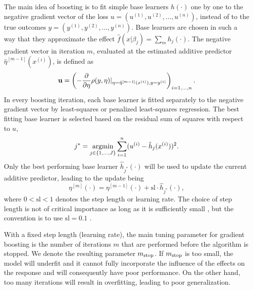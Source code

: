 The main idea of boosting is to fit simple base learners $h(\cdot)$ one by one to the negative gradient vector of the loss $u=(u^{(1)},u^{(2)},\ldots,u^{(n)})$, instead of to the true outcomes $y=(y^{(1)},y^{(2)},\ldots,y^{(n)})$. Base learners are chosen in such a way that they approximate the effect $\hat{f}(x|\beta_j)=\sum_mh_j(\cdot)$. The negative gradient vector in iteration $m$, evaluated at the estimated additive predictor $\hat{\eta}^{[m-1]}(x^{(i)})$, is defined as
\begin{equation*}
    \mathbf{u}=\left(-\frac{\partial}{\partial\eta}\rho(y,\eta)\rvert_{\eta=\hat{\eta}^{[m-1]}(x^{(i)}),y=y^{(i)}}\right)_{i=1,\ldots,n}.
\end{equation*}
In every boosting iteration, each base learner is fitted separately to the negative gradient vector by least-squares or penalized least-squares regression.
The best fitting base learner is selected based on the residual sum of squares with respect to $u$,
\begin{equation*}
    j^*=\operatorname*{argmin}_{j\in\{1,\ldots,J\}}\sum_{i=1}^{n}(u^{(i)}-\hat{h}_j(x^{(i)}))^2.
\end{equation*}
Only the best performing base learner $\hat{h}_{j^*}(\cdot)$ will be used to update the current additive predictor, leading to the update being
\begin{equation*}
    \eta^{[m]}(\cdot)=\eta^{[m-1]}(\cdot)+\text{sl}\cdot\hat{h}_{j^*}(\cdot),
\end{equation*}
where $0<\text{sl}<1$ denotes the step length or learning rate. The choice of step length is not of critical importance as long as it is sufficiently small \citep{schmid-hothorn}, but the convention is to use $\text{sl}=0.1$ \citep{mayr14a}.

With a fixed step length (learning rate), the main tuning parameter for gradient boosting is the number of iterations $m$ that are performed before the algorithm is stopped. We denote the resulting parameter $m_{\text{stop}}$. If $m_{\text{stop}}$ is too small, the model will underfit and it cannot fully incorporate the influence of the effects on the response and will consequently have poor performance. On the other hand, too many iterations will result in overfitting, leading to poor generalization.